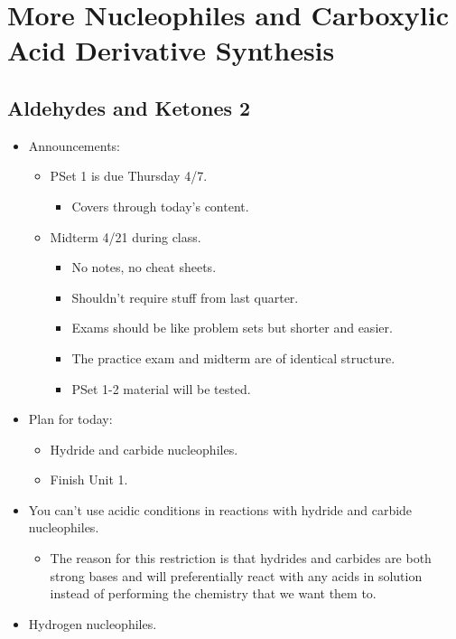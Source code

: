 \documentclass[../notes.tex]{subfiles}
\begin{document}
\chapter{More Nucleophiles and Carboxylic Acid Derivative Synthesis}
\section{Aldehydes and Ketones 2}
\begin{itemize}
    \item {}Announcements:
    \begin{itemize}
        \item PSet 1 is due Thursday 4/7.
        \begin{itemize}
            \item Covers through today's content.
        \end{itemize}
        \item Midterm 4/21 during class.
        \begin{itemize}
            \item No notes, no cheat sheets.
            \item Shouldn't require stuff from last quarter.
            \item Exams should be like problem sets but shorter and easier.
            \item The practice exam and midterm are of identical structure.
            \item PSet 1-2 material will be tested.
        \end{itemize}
    \end{itemize}
    \item Plan for today:
    \begin{itemize}
        \item Hydride and carbide nucleophiles.
        \item Finish Unit 1.
    \end{itemize}
    \item You can't use acidic conditions in reactions with hydride and carbide nucleophiles.
    \begin{itemize}
        \item The reason for this restriction is that hydrides and carbides are both strong bases and will preferentially react with any acids in solution instead of performing the chemistry that we want them to.
    \end{itemize}
    \item Hydrogen nucleophiles.

\end{itemize}
\end{document}
